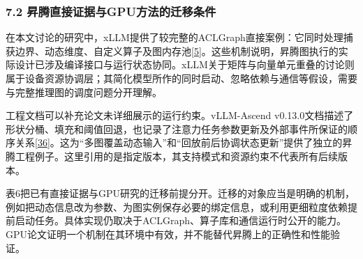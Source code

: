 \documentclass[UTF8,11pt,fontset=windows]{ctexart}
\begin{document}
\hypertarget{section-7-2}{%
\subsubsection{\texorpdfstring{\textbf{7.2 昇腾直接证据与GPU方法的迁移条件}}{7.2 昇腾直接证据与GPU方法的迁移条件}}\label{section-7-2}}

在本文讨论的研究中，xLLM提供了较完整的ACLGraph直接案例：它同时处理捕获边界、动态维度、自定义算子及图内存池\protect\hyperlink{ref-5}{{[}5{]}}。这些机制说明，昇腾图执行的实际设计已涉及编译接口与运行状态协同。xLLM关于矩阵与向量单元重叠的讨论则属于设备资源协调层；其简化模型所作的同时启动、忽略依赖与通信等假设，需要与完整推理图的调度问题分开理解。

工程文档可以补充论文未详细展示的运行约束。vLLM-Ascend v0.13.0文档描述了形状分桶、填充和阈值回退，也记录了注意力任务参数更新及外部事件所保证的顺序关系\protect\hyperlink{ref-36}{{[}36{]}}。这为``多图覆盖动态输入''和``回放前后协调状态更新''提供了独立的昇腾工程例子。这里引用的是指定版本，其支持模式和资源约束不代表所有后续版本。

表6把已有直接证据与GPU研究的迁移前提分开。迁移的对象应当是明确的机制，例如把动态信息改为参数、为图实例保存必要的绑定信息，或利用更细粒度依赖提前启动任务。具体实现仍取决于ACLGraph、算子库和通信运行时公开的能力。GPU论文证明一个机制在其环境中有效，并不能替代昇腾上的正确性和性能验证。
\end{document}
